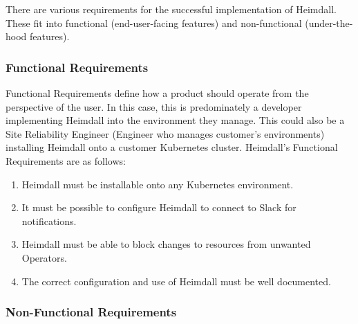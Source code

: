 \documentclass{article}
\begin{document}
There are various requirements for the successful implementation of Heimdall. These fit into functional (end-user-facing features) and non-functional (under-the-hood features). 


\subsubsection{Functional Requirements}

Functional Requirements define how a product should operate from the perspective of the user. In this case, this is predominately a developer implementing Heimdall into the environment they manage. This could also be a Site Reliability Engineer (Engineer who manages customer's environments) installing Heimdall onto a customer Kubernetes cluster. Heimdall's Functional Requirements are as follows:
\begin{enumerate}
    \itemsep0em 
    \item Heimdall must be installable onto any Kubernetes environment.
    \item It must be possible to configure Heimdall to connect to Slack for notifications.
    \item Heimdall must be able to block changes to resources from unwanted Operators. 
    \item The correct configuration and use of Heimdall must be well documented.
\end{enumerate}



\subsubsection{Non-Functional Requirements}
\end{document}
